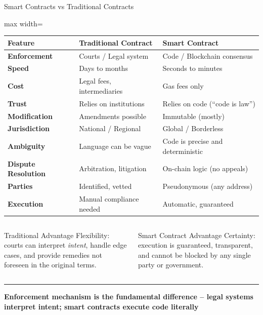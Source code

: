 \documentclass[8pt,aspectratio=169]{beamer}
\newcommand{\bottomnote}[1]{\vfill\vspace{-2mm}\textcolor{mllavender2}{\rule{\textwidth}{0.4pt}}\vspace{1mm}\footnotesize\textbf{#1}}
\begin{document}
\begin{frame}{Smart Contracts vs Traditional Contracts}
\centering
\vspace{-1mm}
\begin{adjustbox}{max width=\textwidth}
\begin{tabular}{>{\bfseries}l l l}
\toprule
\textbf{Feature} & \textbf{Traditional Contract} & \textbf{Smart Contract} \\
\midrule
\rowcolor{mllavender4}
Enforcement & Courts / Legal system & Code / Blockchain consensus \\
Speed & Days to months & Seconds to minutes \\
\rowcolor{mllavender4}
Cost & Legal fees, intermediaries & Gas fees only \\
Trust & Relies on institutions & Relies on code (``code is law'') \\
\rowcolor{mllavender4}
Modification & Amendments possible & Immutable (mostly) \\
Jurisdiction & National / Regional & Global / Borderless \\
\rowcolor{mllavender4}
Ambiguity & Language can be vague & Code is precise and deterministic \\
Dispute Resolution & Arbitration, litigation & On-chain logic (no appeals) \\
\rowcolor{mllavender4}
Parties & Identified, vetted & Pseudonymous (any address) \\
Execution & Manual compliance needed & Automatic, guaranteed \\
\bottomrule
\end{tabular}
\end{adjustbox}
\vspace{3mm}
\begin{columns}[T]
\begin{alertblock}{Traditional Advantage}
\footnotesize
Flexibility: courts can interpret \emph{intent}, handle edge cases, and provide remedies not foreseen in the original terms.
\end{alertblock}
\begin{exampleblock}{Smart Contract Advantage}
\footnotesize
Certainty: execution is guaranteed, transparent, and cannot be blocked by any single party or government.
\end{exampleblock}
\end{columns}
\bottomnote{Enforcement mechanism is the fundamental difference -- legal systems interpret intent; smart contracts execute code literally}
\end{frame}
\end{document}
